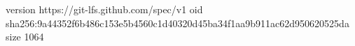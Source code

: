 version https://git-lfs.github.com/spec/v1
oid sha256:9a44352f6b486c153e5b4560c1d40320d45ba34f1aa9b911ac62d950620525da
size 1064
